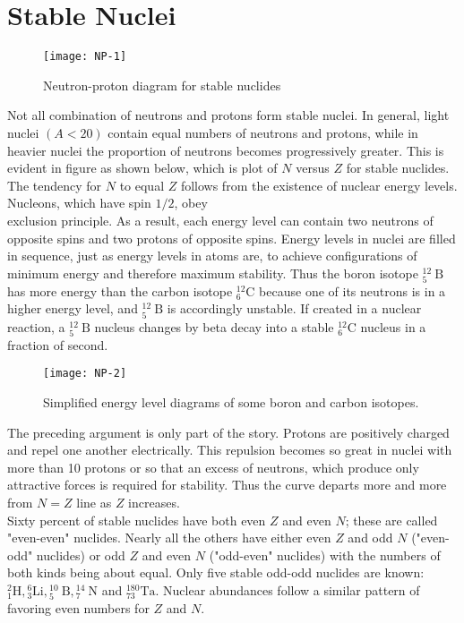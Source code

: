 \section{Stable Nuclei}
\begin{figure}[H]
	\centering
	\texttt{[image: NP-1]}
	\caption{Neutron-proton diagram for stable nuclides}
	\label{}
\end{figure}
Not all combination of neutrons and protons form stable nuclei. In general, light nuclei $(A<20)$ contain equal numbers of neutrons and protons, while in heavier nuclei the proportion of neutrons becomes progressively greater. This is evident in figure as shown below, which is plot of $N$ versus $Z$ for stable nuclides.\\
The tendency for $N$ to equal $Z$ follows from the existence of nuclear energy levels. Nucleons, which have spin $1 / 2$, obey\\
exclusion principle. As a result, each energy level can contain two neutrons of opposite spins and two protons of opposite spins. Energy levels in nuclei are filled in sequence, just as energy levels in atoms are, to achieve configurations of minimum energy and therefore maximum stability. Thus the boron isotope ${ }_5^{12} \mathrm{~B}$ has more energy than the carbon isotope ${ }_6^{12} \mathrm{C}$ because one of its neutrons is in a higher energy level, and ${ }_5^{12} \mathrm{~B}$ is accordingly unstable. If created in a nuclear reaction, a ${ }_5^{12} \mathrm{~B}$ nucleus changes by beta decay into a stable ${ }_6^{12} \mathrm{C}$ nucleus in a fraction of second.
\begin{figure}[H]
	\centering
	\texttt{[image: NP-2]}
	\caption{Simplified energy level diagrams of some boron and carbon isotopes.}
	\label{}
\end{figure}
The preceding argument is only part of the story. Protons are positively charged and repel one another electrically. This repulsion becomes so great in nuclei with more than 10 protons or so that an excess of neutrons, which produce only attractive forces is required for stability. Thus the curve departs more and more from $N=Z$ line as $Z$ increases.\\
Sixty percent of stable nuclides have both even $Z$ and even $N$; these are called "even-even" nuclides. Nearly all the others have either even $Z$ and odd $N$ ("even-odd" nuclides) or odd $Z$ and even $N$ ("odd-even" nuclides) with the numbers of both kinds being about equal. Only five stable odd-odd nuclides are known: ${ }_1^2 \mathrm{H},{ }_3^6 \mathrm{Li},{ }_5^{10} \mathrm{~B},{ }_7^{14} \mathrm{~N}$ and ${ }_{73}^{180} \mathrm{Ta}$. Nuclear abundances follow a similar pattern of favoring even numbers for $Z$ and $N$.\\
